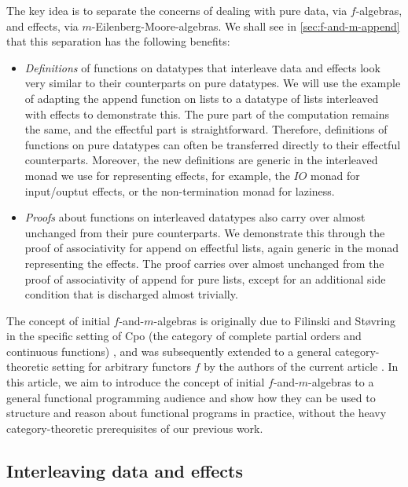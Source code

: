 \documentclass{jfp1}
\begin{document}
The key idea is to separate the concerns of dealing with pure data,
via $f$-algebras, and effects, via $m$-Eilenberg-Moore-algebras. We
shall see in \autoref{sec:f-and-m-append} that this separation has the
following benefits:
\begin{itemize}
\item \emph{Definitions} of functions on datatypes that interleave
  data and effects look very similar to their counterparts on pure
  datatypes. We will use the example of adapting the append function
  on lists to a datatype of lists interleaved with effects to
  demonstrate this. The pure part of the computation remains the same,
  and the effectful part is straightforward. Therefore, definitions of
  functions on pure datatypes can often be transferred directly to
  their effectful counterparts. Moreover, the new definitions are
  generic in the interleaved monad we use for representing effects,
  for example, the $\mathit{IO}$ monad for input/ouptut effects, or
  the non-termination monad for laziness.
\item \emph{Proofs} about functions on interleaved datatypes also
  carry over almost unchanged from their pure counterparts. We
  demonstrate this through the proof of associativity for append on
  effectful lists, again generic in the monad representing the
  effects. The proof carries over almost unchanged from the proof of
  associativity of append for pure lists, except for an additional
  side condition that is discharged almost trivially.
\end{itemize}


The concept of initial $f$-and-$m$-algebras is originally due to
Filinski and St\o{}vring in the specific setting of Cpo (the category
of complete partial orders and continuous functions)
\cite{filinski07inductive}, and was subsequently extended to a general
category-theoretic setting for arbitrary functors $f$ by the authors
of the current article \cite{atkey12fibrational}. In this article, we
aim to introduce the concept of initial $f$-and-$m$-algebras to a
general functional programming audience and show how they can be used
to structure and reason about functional programs in practice, without
the heavy category-theoretic prerequisites of our previous work.

\subsection{Interleaving data and effects}
\label{sec:motivate-interleaving}
\end{document}
